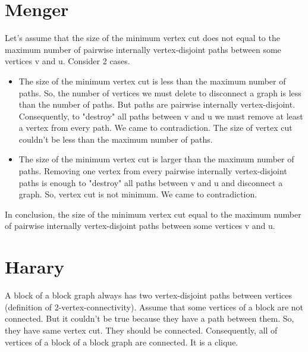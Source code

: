 \documentclass[12pt, letterpaper]{article}
\begin{document}
\section{Menger}
Let's assume that the size of the minimum vertex cut does not equal to the maximum number of pairwise internally vertex-disjoint paths between some vertices v and u. Consider 2 cases.
\begin{itemize}
  \item The size of the minimum vertex cut is less than the maximum number of paths.\newline
  So, the number of vertices we must delete to disconnect a graph is less than the number of paths. But paths are pairwise internally vertex-disjoint. Consequently, to "destroy" all paths between v and u we must remove at least a vertex from every path. We came to contradiction. The size of vertex cut couldn't be less than the maximum number of paths.
  \item The size of the minimum vertex cut is larger than the maximum number of paths.\newline
  Removing one vertex from every pairwise internally vertex-disjoint paths is enough to "destroy" all paths between v and u and disconnect a graph. So, vertex cut is not minimum. We came to contradiction.  
\end{itemize}
In conclusion, the size of the minimum vertex cut equal to the maximum number of pairwise internally vertex-disjoint paths between some vertices v and u.

\section{Harary}
A block of a block graph always has two vertex-disjoint paths between vertices (definition of 2-vertex-connectivity). Assume that some vertices of a block are not connected. But it couldn't be true because they have a path between them. So, they have same vertex cut. They should be connected. \newline
Consequently, all of vertices of a block of a block graph are connected. It is a clique.
\end{document}
